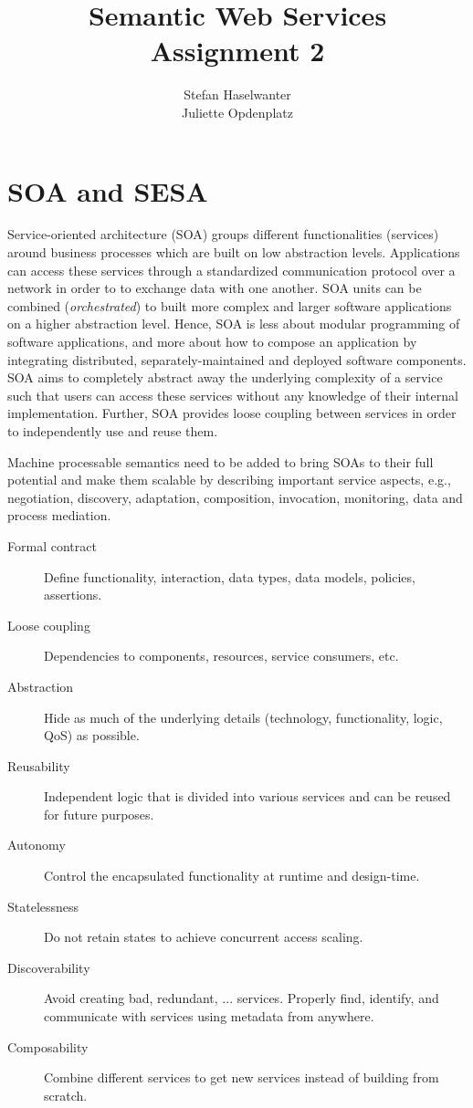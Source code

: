 \documentclass[a4paper]{article}
\title{\textbf{Semantic Web Services}\\\large{Assignment 2}}
\author{Stefan Haselwanter\\Juliette Opdenplatz}
\begin{document}
\maketitle


\section{SOA and SESA}
Service-oriented architecture (SOA) groups different functionalities (services) around business processes which are built on low abstraction levels.
Applications can access these services through a standardized communication protocol over a network in order to to exchange data with one another.
SOA units can be combined (\emph{orchestrated}) to built more complex and larger software applications on a higher abstraction level.
Hence, SOA is less about modular programming of software applications, and more about how to compose an application by integrating distributed, separately-maintained and deployed software components.
SOA aims to completely abstract away the underlying complexity of a service such that users can access these services without any knowledge of their internal implementation.
Further, SOA provides loose coupling between services in order to independently use and reuse them.

Machine processable semantics need to be added to bring SOAs to their full potential and make them scalable by describing important service aspects,
e.g., negotiation, discovery, adaptation, composition, invocation, monitoring, data and process mediation.

\begin{description}
  \item[Formal contract] Define functionality, interaction, data types, data models, policies, assertions.
  \item[Loose coupling] Dependencies to components, resources, service consumers, etc.
  \item[Abstraction] Hide as much of the underlying details (technology, functionality, logic, QoS) as possible.
  \item[Reusability] Independent logic that is divided into various services and can be reused for future purposes.
  \item[Autonomy] Control the encapsulated functionality at runtime and design-time.
  \item[Statelessness] Do not retain states to achieve concurrent access scaling.
  \item[Discoverability] Avoid creating bad, redundant, ... services.
  Properly find, identify, and communicate with services using metadata from anywhere.
  \item[Composability] Combine different services to get new services instead of building from scratch.
\end{description}
\end{document}
